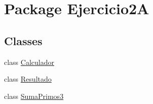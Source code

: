 \hypertarget{namespace_ejercicio2_a}{}\section{Package Ejercicio2A}
\label{namespace_ejercicio2_a}
\subsection*{Classes}
\begin{DoxyCompactItemize}
\item 
class \mbox{\hyperlink{class_ejercicio2_a_1_1_calculador}{Calculador}}
\item 
class \mbox{\hyperlink{class_ejercicio2_a_1_1_resultado}{Resultado}}
\item 
class \mbox{\hyperlink{class_ejercicio2_a_1_1_suma_primos3}{Suma\+Primos3}}
\end{DoxyCompactItemize}
